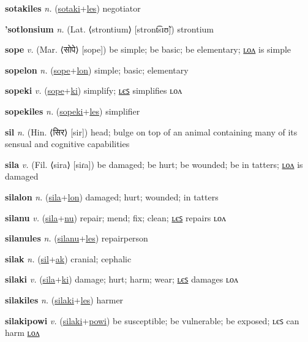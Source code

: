 \textbf{\hypertarget{sotakiles}{sotakiles}} \textit{n.} (\hyperlink{sotaki}{sotaki}+\allowbreak \hyperlink{les}{les})
negotiator

\textbf{\hypertarget{'sotlonsium}{'sotlonsium}} \textit{n.} (Lat. ⟨strontium⟩ [stront͡sɪʊ̃])
strontium

\textbf{\hypertarget{sope}{sope}} \textit{v.} (Mar. ⟨{\devanagari{}सोपे}⟩ [sope])
be simple; be basic; be elementary; \hyperlink{sopelon}{ʟᴏᴧ} is simple

\textbf{\hypertarget{sopelon}{sopelon}} \textit{n.} (\hyperlink{sope}{sope}+\allowbreak \hyperlink{lon}{lon})
simple; basic; elementary

\textbf{\hypertarget{sopeki}{sopeki}} \textit{v.} (\hyperlink{sope}{sope}+\allowbreak \hyperlink{ki}{ki})
simplify; \hyperlink{sopekiles}{ʟєꜱ} simplifies ʟᴏᴧ

\textbf{\hypertarget{sopekiles}{sopekiles}} \textit{n.} (\hyperlink{sopeki}{sopeki}+\allowbreak \hyperlink{les}{les})
simplifier

\textbf{\hypertarget{sil}{sil}} \textit{n.} (Hin. ⟨{\devanagari{}सिर}⟩ [sir])
head; bulge on top of an animal containing many of its sensual and cognitive capabilities

\textbf{\hypertarget{sila}{sila}} \textit{v.} (Fil. ⟨sira⟩ [siɾa])
be damaged; be hurt; be wounded; be in tatters; \hyperlink{silalon}{ʟᴏᴧ} is damaged

\textbf{\hypertarget{silalon}{silalon}} \textit{n.} (\hyperlink{sila}{sila}+\allowbreak \hyperlink{lon}{lon})
damaged; hurt; wounded; in tatters

\textbf{\hypertarget{silanu}{silanu}} \textit{v.} (\hyperlink{sila}{sila}+\allowbreak \hyperlink{nu}{nu})
repair; mend; fix; clean; \hyperlink{silanules}{ʟєꜱ} repairs ʟᴏᴧ

\textbf{\hypertarget{silanules}{silanules}} \textit{n.} (\hyperlink{silanu}{silanu}+\allowbreak \hyperlink{les}{les})
repairperson

\textbf{\hypertarget{silak}{silak}} \textit{n.} (\hyperlink{sil}{sil}+\allowbreak \hyperlink{ak}{ak})
cranial; cephalic

\textbf{\hypertarget{silaki}{silaki}} \textit{v.} (\hyperlink{sila}{sila}+\allowbreak \hyperlink{ki}{ki})
damage; hurt; harm; wear; \hyperlink{silakiles}{ʟєꜱ} damages ʟᴏᴧ

\textbf{\hypertarget{silakiles}{silakiles}} \textit{n.} (\hyperlink{silaki}{silaki}+\allowbreak \hyperlink{les}{les})
harmer

\textbf{\hypertarget{silakipowi}{silakipowi}} \textit{v.} (\hyperlink{silaki}{silaki}+\allowbreak \hyperlink{powi}{powi})
be susceptible; be vulnerable; be exposed; ʟєꜱ can harm \hyperlink{silakipowilon}{ʟᴏᴧ}

